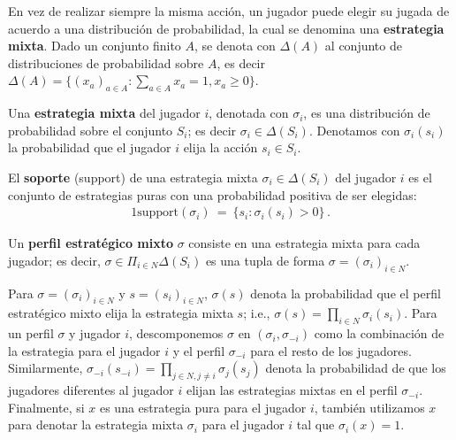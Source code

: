 En vez de realizar siempre la misma acción, un jugador puede elegir su jugada de acuerdo a una distribución de probabilidad, la cual se denomina una \textbf{estrategia mixta}. Dado un conjunto finito $A$, se denota con $\Delta(A)$ al conjunto de distribuciones de probabilidad sobre $A$, es decir $\Delta(A) = \{ (x_a)_{a \in A} : \sum_{a \in A} x_a = 1, x_a \geq 0\}$. 

\begin{definition} Una \textbf{estrategia mixta} del jugador $i$, denotada con $\sigma_i$, es una distribución de probabilidad sobre el conjunto $S_i$; es decir $\sigma_i \in \Delta(S_i)$. Denotamos con $\sigma_i(s_i)$ la probabilidad que el jugador $i$ elija la acción $s_i \in S_i$. 
\end{definition}

\begin{definition}
El \textbf{soporte} (support) de una estrategia mixta $\sigma_i \in \Delta(S_i)$ del jugador $i$ es el conjunto de estrategias puras con una probabilidad positiva de ser elegidas:
\begin{alignat}{1}
\text{support}(\sigma_i)\ =\ \{s_i : \sigma_i(s_i) > 0 \} \,.
\end{alignat}
\end{definition}

\begin{definition}
Un \textbf{perfil estratégico mixto} $\sigma$ consiste en una estrategia mixta para cada jugador; es decir, $\sigma \in \Pi_{i \in N} \Delta(S_i)$ es una tupla de forma $\sigma=(\sigma_i)_{i \in N}$.
\end{definition}

Para $\sigma = (\sigma_i)_{i \in N}$ y $s = (s_i)_{i \in N}$, $\sigma(s)$ denota la probabilidad que el perfil estratégico mixto elija la estrategia mixta $s$; i.e., $\sigma(s)=\prod_{i\in N} \sigma_i(s_i)$. Para un perfil $\sigma$ y jugador $i$, descomponemos $\sigma$ en $(\sigma_i,\sigma_{-i})$ como la combinación de la estrategia para el jugador $i$ y el perfil $\sigma_{-i}$ para el resto de los jugadores. Similarmente, $\sigma_{-i}(s_{-i})=\prod_{j\in N,j\neq i}\sigma_j(s_j)$ denota la probabilidad de que los jugadores diferentes al jugador $i$ elijan las estrategias mixtas en el perfil $\sigma_{-i}$. Finalmente, si $x$ es una estrategia pura para el jugador $i$, también utilizamos $x$ para denotar la estrategia mixta $\sigma_i$ para el jugador $i$ tal que $\sigma_i(x)=1$.

